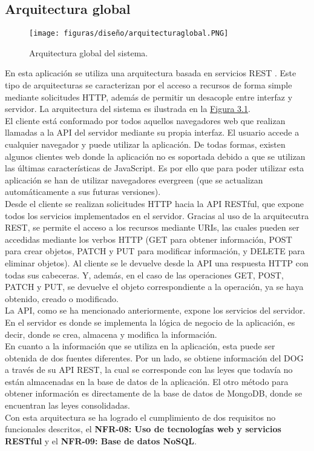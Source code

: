 \subsection{Arquitectura global}

\begin{figure}[H]
\centerline{\texttt{[image: figuras/diseño/arquitecturaglobal.PNG]}}
\caption{Arquitectura global del sistema.}
\label{enlaceArquitecturaGlobal}
\end{figure}

En esta aplicación se utiliza una arquitectura basada en servicios REST \cite{rest}. Este tipo de arquitecturas se caracterizan por el acceso a recursos de forma simple mediante solicitudes HTTP, además de permitir un desacople entre interfaz y servidor. La arquitectura del sistema es ilustrada en la \hyperref[enlaceArquitecturaGlobal]{Figura 3.1}.
\\

El cliente está conformado por todos aquellos navegadores web que realizan llamadas a la API del servidor mediante su propia interfaz. El usuario accede a cualquier navegador y puede utilizar la aplicación. De todas formas, existen algunos clientes web donde la aplicación no es soportada debido a que se utilizan las últimas características de JavaScript. Es por ello que para poder utilizar esta aplicación se han de utilizar navegadores evergreen \cite{evergreen} (que se actualizan automáticamente a sus futuras versiones).
\\

Desde el cliente se realizan solicitudes HTTP hacia la API RESTful, que expone todos los servicios implementados en el servidor. Gracias al uso de la arquitecutra REST, se permite el acceso a los recursos mediante URIs, las cuales pueden ser accedidas mediante los verbos HTTP (GET para obtener información, POST para crear objetos, PATCH y PUT para modificar información, y DELETE para eliminar objetos). Al cliente se le devuelve desde la API una respuesta HTTP con todas sus cabeceras. Y, además, en el caso de las operaciones GET, POST, PATCH y PUT, se devuelve el objeto correspondiente a la operación, ya se haya obtenido, creado o modificado.
\\

La API, como se ha mencionado anteriormente, expone los servicios del servidor. En el servidor es donde se implementa la lógica de negocio \cite{logicanegocio} de la aplicación, es decir, donde se crea, almacena y modifica la información.
\\

En cuanto a la información que se utiliza en la aplicación, esta puede ser obtenida de dos fuentes diferentes. Por un lado, se obtiene información del DOG a través de su API REST, la cual se corresponde con las leyes que todavía no están almacenadas en la base de datos de la aplicación. El otro método para obtener información es directamente de la base de datos de MongoDB, donde se encuentran las leyes consolidadas.
\\

Con esta arquitectura se ha logrado el cumplimiento de dos requisitos no funcionales descritos, el {\bf NFR-08: Uso de tecnologías web y servicios RESTful} y el {\bf NFR-09: Base de datos NoSQL}.